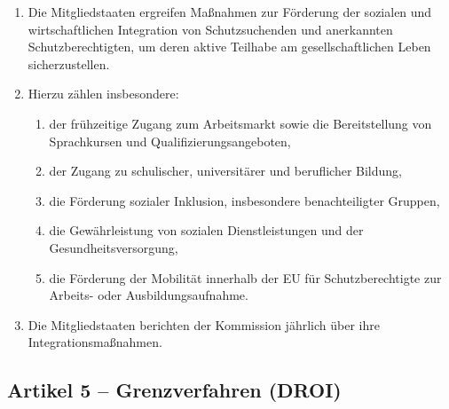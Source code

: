\documentclass[12pt,a4paper]{article}
\begin{document}
\begin{enumerate}[leftmargin=2em, itemsep=6pt]
  \item Die Mitgliedstaaten ergreifen Maßnahmen zur Förderung der sozialen und wirtschaftlichen Integration von Schutzsuchenden und anerkannten Schutzberechtigten, um deren aktive Teilhabe am gesellschaftlichen Leben sicherzustellen.
  \item Hierzu zählen insbesondere:
  \begin{enumerate}[label=(\alph*), leftmargin=1.8em, itemsep=4pt]
    \item der frühzeitige Zugang zum Arbeitsmarkt sowie die Bereitstellung von Sprachkursen und Qualifizierungsangeboten,

    \item der Zugang zu schulischer, universitärer und beruflicher Bildung,

    \item die Förderung sozialer Inklusion, insbesondere benachteiligter Gruppen,

    \item die Gewährleistung von sozialen Dienstleistungen und der Gesundheitsversorgung,

    \item die Förderung der Mobilität innerhalb der EU für Schutzberechtigte zur Arbeits- oder Ausbildungsaufnahme.
  \end{enumerate}
  \item Die Mitgliedstaaten berichten der Kommission jährlich über ihre Integrationsmaßnahmen.
\end{enumerate}

\subsection*{Artikel 5 – Grenzverfahren (DROI)}
\end{document}
